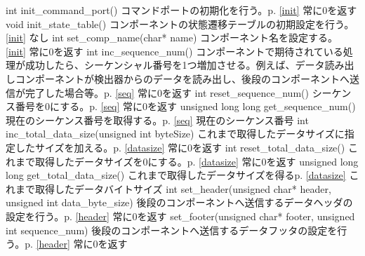 \documentclass[a4j,10pt,dvips,onecolumn,oneside,final]{jarticle}%
\begin{document}
       {int init\_command\_port()} 
       {コマンドポートの初期化を行う。p.\pageref{init} \ref{init}} 
       {常に0を返す} 
       {}
       {void init\_state\_table()}
       {コンポーネントの状態遷移テーブルの初期設定を行う。\pageref{init} \ref{init}}
       {なし}
       {}
       {int set\_comp\_name(char{*} name)}
       {コンポーネント名を設定する。\pageref{init} \ref{init}}
       {常に0を返す}
       {}
       {int inc\_sequence\_num() }
       {コンポーネントで期待されている処理が成功したら、シーケンシャル番号を1つ増加させる。例えば、データ読み出しコンポーネントが検出器からのデータを読み出し、後段のコンポーネントへ送信が完了した場合等。p.\pageref{seq} \ref{seq}}
       {常に0を返す}
       {}
       {int reset\_sequence\_num() }
       {シーケンス番号を0にする。p.\pageref{seq} \ref{seq}}
       {常に0を返す}
       {}
       {unsigned long long get\_sequence\_num() }
       {現在のシーケンス番号を取得する。p.\pageref{seq} \ref{seq}}
       {現在のシーケンス番号}
       {}
       {int inc\_total\_data\_size(unsigned int byteSize)}
       {これまで取得したデータサイズに指定したサイズを加える。p.\pageref{datasize} \ref{datasize}}
       {常に0を返す}
       {}
       {int reset\_total\_data\_size() }
       {これまで取得したデータサイズを0にする。p.\pageref{datasize} \ref{datasize}}
       {常に0を返す}
       {}
       {unsigned long long get\_total\_data\_size() }
       {これまで取得したデータサイズを得るp.\pageref{datasize} \ref{datasize}}
       {これまで取得したデータバイトサイズ}
       {}
       {int set\_header(unsigned char{*} header, unsigned int data\_byte\_size) }
       {後段のコンポーネントへ送信するデータヘッダの設定を行う。p.\pageref{header} \ref{header}}
       {常に0を返す}
       {}
       {set\_footer(unsigned char{*} footer, unsigned int sequence\_num) }
       {後段のコンポーネントへ送信するデータフッタの設定を行う。p.\pageref{header} \ref{header}}
       {常に0を返す}
       {}
\end{document}
